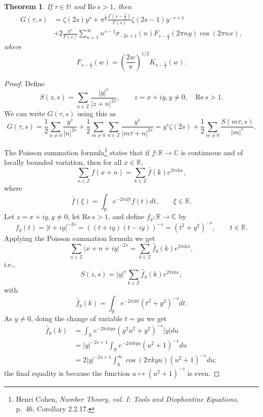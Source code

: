 \documentclass{article}
\def\Re{\ensuremath{\mathrm{Re}}\,}
\newtheorem{theorem}{Theorem}
\theoremstyle{definition}
\begin{document}
\begin{theorem}
If  $\tau \in \mathbb{H}$ and $\Re s>1$, then
\begin{align*}
G(\tau,s)&= \zeta(2s)y^s   +\pi^{\frac{1}{2}} \frac{ \Gamma\left(s-\frac{1}{2}\right)}{\Gamma(s)}  \zeta(2s-1)y^{-s+1}\\
&+2 \frac{\pi^s}{\Gamma(s)} \sum_{n=1}^\infty n^{s-1} \sigma_{-2s+1}(n) F_{s-\frac{1}{2}}(2\pi ny) \cos(2\pi nx),
\end{align*}
where
\[
F_{s-\frac{1}{2}}(w)=\left(\frac{2w}{\pi}\right)^{1/2} K_{s-\frac{1}{2}}(w).
\]
\label{GFourier}
\end{theorem}
\begin{proof}
Define 
\[
S(z,s) = \sum_{n \in \mathbb{Z}} \frac{|y|^s}{|z+n|^{2s}}, \qquad z=x+iy, y\neq 0,
\quad \Re s >1.
\]
We can write $G(\tau,s)$ using this as
\[
G(\tau,s)=\frac{1}{2} \sum_{n \neq 0} \frac{y^s}{|n|^{2s}}
+\frac{1}{2} \sum_{m \neq 0} \sum_{n \in \mathbb{Z}} \frac{y^s}{|m\tau+n|^{2s}}
=y^s \zeta(2s) +\frac{1}{2}\sum_{m \neq 0} \frac{S(m\tau,s)}{|m|^s}.
\]

The Poisson summation formula\footnote{Henri Cohen, {\em Number Theory, vol. I: Tools and Diophantine Equations}, p.~46, Corollary 2.2.17.}
states that if $f:\mathbb{R} \to \mathbb{C}$ is continuous and of locally  bounded variation, then
for all $x \in \mathbb{R}$,
\[
\sum_{n \in \mathbb{Z}} f(x+n) = \sum_{k \in \mathbb{Z}} \widehat{f}(k) e^{2\pi ikx},
\]
where
\[
\widehat{f}(\xi) = \int_\mathbb{R} e^{-2\pi i\xi t} f(t) dt, \qquad \xi \in \mathbb{R}.
\]
Let $z=x+iy, y \neq 0$, let $\Re s>1$, and define $f_y:\mathbb{R} \to \mathbb{C}$ by
\[
f_y(t)=|t+iy|^{-2s} =((t+iy)(t-iy))^{-s} = (t^2+y^2)^{-s}, \qquad t \in \mathbb{R}.
\]
Applying the Poisson summation formula we get
\[
\sum_{n \in \mathbb{Z}} |x+n+iy|^{-2s} = \sum_{k \in \mathbb{Z}} \widehat{f}_y(k) e^{2\pi ikx},
\]
i.e.,
\begin{equation}
S(z,s) = |y|^s \sum_{k \in \mathbb{Z}} \widehat{f}_y(k) e^{2\pi ikx},
\label{SPoisson}
\end{equation}
with
\[
\widehat{f}_y(k) = \int_{\mathbb{R}} e^{-2\pi ikt} (t^2+y^2)^{-s} dt.
\]
As $y \neq 0$, doing the change of variable $t=yu$ we get
\begin{align*}
\widehat{f}_y(k)&=\int_{\mathbb{R}} e^{-2\pi ikyu} (y^2u^2 +y^2)^{-s} |y|du\\
&=|y|^{-2s+1} \int_{\mathbb{R}} e^{-2\pi ikyu} (u^2+1)^{-s} du\\
&=2|y|^{-2s+1} \int_0^\infty \cos(2\pi kyu) (u^2+1)^{-s} du;
\end{align*}
the final equality is because the function $u \mapsto (u^2+1)^{-s}$ is even. 


\end{proof}
\end{document}
